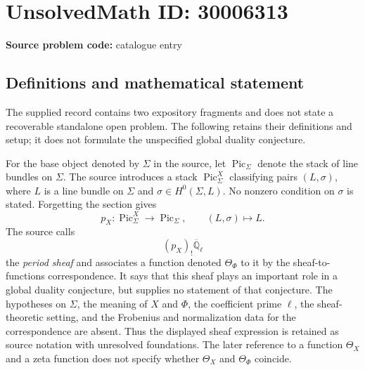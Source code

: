 \documentclass[11pt]{article}
\newcommand{\Q}{\mathbb{Q}}
\begin{document}
\section*{UnsolvedMath ID: 30006313}
\textbf{Source problem code:} catalogue entry
\subsection{Definitions and mathematical statement}
The supplied record contains two expository fragments and does not state a recoverable standalone open problem. The following retains their definitions and setup; it does not formulate the unspecified global duality conjecture.

For the base object denoted by \(\Sigma\) in the source, let \(\operatorname{Pic}_{\Sigma}\) denote the stack of line bundles on \(\Sigma\). The source introduces a stack \(\operatorname{Pic}^{X}_{\Sigma}\) classifying pairs \((L,\sigma)\), where \(L\) is a line bundle on \(\Sigma\) and \(\sigma\in H^{0}(\Sigma,L)\). No nonzero condition on \(\sigma\) is stated. Forgetting the section gives
\[
 p_X:\operatorname{Pic}^{X}_{\Sigma}\longrightarrow\operatorname{Pic}_{\Sigma},\qquad (L,\sigma)\longmapsto L.
\]
The source calls
\[
 (p_X)_!\overline{\Q}_{\ell}
\]
the \emph{period sheaf} and associates a function denoted \(\Theta_{\Phi}\) to it by the sheaf-to-functions correspondence. It says that this sheaf plays an important role in a global duality conjecture, but supplies no statement of that conjecture. The hypotheses on \(\Sigma\), the meaning of \(X\) and \(\Phi\), the coefficient prime \(\ell\), the sheaf-theoretic setting, and the Frobenius and normalization data for the correspondence are absent. Thus the displayed sheaf expression is retained as source notation with unresolved foundations. The later reference to a function \(\Theta_X\) and a zeta function does not specify whether \(\Theta_X\) and \(\Theta_{\Phi}\) coincide.
\end{document}
